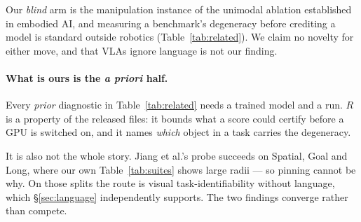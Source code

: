 \documentclass[10pt,twocolumn]{article}
\begin{document}
Our \emph{blind} arm is the manipulation instance of the unimodal ablation
\citet{thomason2019shifting} established in embodied AI, and measuring a
benchmark's degeneracy before crediting a model is standard outside robotics
(Table~\ref{tab:related}). We claim no novelty for either move, and that VLAs
ignore language is not our finding.

\paragraph{What is ours is the \emph{a priori} half.} Every \emph{prior} diagnostic in Table~\ref{tab:related} needs a trained model
and a run. $R$ is a property of
the released files: it bounds what a score could certify before a GPU is
switched on, and it names \emph{which} object in a task carries the degeneracy.

It is also not the whole story. Jiang et al.'s probe succeeds on Spatial, Goal and Long, where our own
Table~\ref{tab:suites} shows large radii --- so pinning cannot be why. On those
splits the route is visual task-identifiability without language, which
\S\ref{sec:language} independently supports. The two findings converge rather
than compete.
\end{document}
